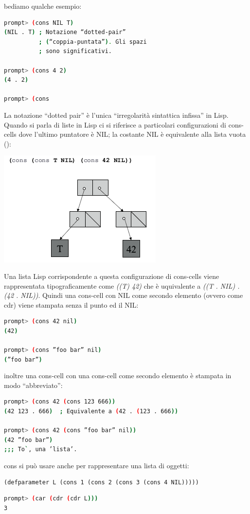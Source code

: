 \documentclass[a4paper,12pt, oneside]{book}
\begin{document}
bediamo qualche esempio:
\begin{shaded}
\begin{lstlisting}[language=bash]
prompt> (cons NIL T)
(NIL . T) ; Notazione “dotted-pair”
          ; (“coppia-puntata”). Gli spazi
          ; sono significativi.
          
prompt> (cons 4 2)
(4 . 2)

prompt> (cons
\end{lstlisting}
\end{shaded}
La notazione “dotted pair” è l’unica “irregolarità sintattica infissa” in Lisp.		
\\
Quando si parla di liste in Lisp ci si riferisce a particolari configurazioni di cons-cells dove l’ultimo puntatore è NIL; la costante NIL è equivalente alla lista vuota ():
\begin{center}
\includegraphics[scale=0.7]{img/cons3.png}
\end{center}
Una lista Lisp corrispondente a questa configurazione di cons-cells viene rappresentata tipograficamente come \textit{((T) 42)} che è uquivalente a \textit{((T . NIL) . (42 . NIL))}. Quindi una cons-cell con NIL come secondo
elemento (ovvero come cdr) viene stampata senza il punto ed il NIL:
\begin{shaded}
\begin{lstlisting}[language=bash]
prompt> (cons 42 nil)
(42)

prompt> (cons ”foo bar” nil)
(”foo bar”)
\end{lstlisting}
\end{shaded}
inoltre una cons-cell con una cons-cell come secondo elemento è stampata in modo “abbreviato”:
\begin{shaded}
\begin{lstlisting}[language=bash]
prompt> (cons 42 (cons 123 666))
(42 123 . 666)  ; Equivalente a (42 . (123 . 666))

prompt> (cons 42 (cons ”foo bar” nil))
(42 ”foo bar”)
;;; To`, una ’lista’.
\end{lstlisting}
\end{shaded}
cons si può usare anche per rappresentare una lista di oggetti:
\begin{verbatim}
(defparameter L (cons 1 (cons 2 (cons 3 (cons 4 NIL)))))
\end{verbatim}
\begin{shaded}
\begin{lstlisting}[language=bash]
prompt> (car (cdr (cdr L)))
3
\end{lstlisting}
\end{shaded}
\end{document}
